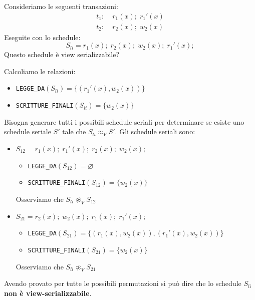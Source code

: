 \documentclass[a4paper,twoside]{article}
\begin{document}
\begin{exercise}
  Consideriamo le seguenti transazioni:
  \[
  \begin{aligned}
    t_1:\; & r_1(x); \; r_1'(x) \\
    t_2:\; & r_2(x); \; w_2(x)
  \end{aligned}
  \] 
  Eseguite con lo schedule:
  \[
    S_{li} = r_1(x); \; r_2(x); \; w_2(x); \; r_1'(x);
  \] 
  Questo schedule è view serializzabile?

  \vspace{1em}
  \noindent
  Calcoliamo le relazioni:
  \begin{itemize}
    \item \texttt{LEGGE\_DA}\( (S_{li}) = \{ (r_1'(x), w_2(x)) \} \)
    \item \texttt{SCRITTURE\_FINALI}\( (S_{li}) = \{ w_2(x) \} \)
  \end{itemize}
  
  \vspace{1em}
  \noindent
  Bisogna generare tutti i possibili schedule seriali per determinare se
  esiste uno schedule seriale \( S' \) tale che \( S_{li} \approx_V S' \).
  Gli schedule seriali sono:
  \begin{itemize}
    \item \( S_{12} = r_1(x); \; r_1'(x); \; r_2(x); \; w_2(x); \) 
      \begin{itemize}
        \item \texttt{LEGGE\_DA}\( (S_{12}) = \varnothing \)
        \item \texttt{SCRITTURE\_FINALI}\( (S_{12}) = \{ w_2(x) \} \)
      \end{itemize}
      Osserviamo che \( S_{li} \not\approx_V S_{12} \)

    \item \( S_{21} = r_2(x); \; w_2(x); \; r_1(x); \; r_1'(x);\,\) 
      \begin{itemize}
        \item \texttt{LEGGE\_DA}\( (S_{21}) = \{ (r_1(x), w_2(x)), (r_1'(x), w_2(x)) \} \)
        \item \texttt{SCRITTURE\_FINALI}\( (S_{21}) = \{ w_2(x) \} \)
      \end{itemize}
      Osserviamo che \( S_{li} \not\approx_V S_{21} \)
  \end{itemize}
  Avendo provato per tutte le possibili permutazioni si può dire che lo schedule
  \( S_{li} \) \textbf{non è view-serializzabile}.
\end{exercise}
\end{document}
